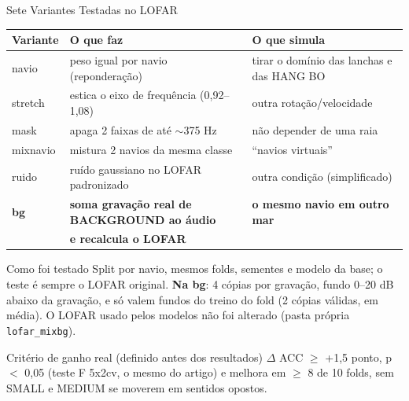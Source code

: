 \documentclass[aspectratio=169]{beamer}
\begin{document}
\begin{frame}{Sete Variantes Testadas no LOFAR}
    \footnotesize
    \begin{table}
    \centering
    \scriptsize
    \setlength{\tabcolsep}{4pt}
    \begin{tabular}{lll}
    \toprule
    Variante & O que faz & O que simula \\
    \midrule
    navio & peso igual por navio (reponderação) & tirar o domínio das lanchas e das HANG BO \\
    stretch & estica o eixo de frequência (0,92--1,08) & outra rotação/velocidade \\
    mask & apaga 2 faixas de até $\sim$375 Hz & não depender de uma raia \\
    mixnavio & mistura 2 navios da mesma classe & ``navios virtuais'' \\
    ruido & ruído gaussiano no LOFAR padronizado & outra condição (simplificado) \\
    \textbf{bg} & \textbf{soma gravação real de BACKGROUND ao áudio} & \textbf{o mesmo navio em outro mar} \\
    & \textbf{e recalcula o LOFAR} & \\
    \bottomrule
    \end{tabular}
    \end{table}
    \vspace{0.05cm}
    \begin{block}{\small Como foi testado}
        \scriptsize
        Split por navio, mesmos folds, sementes e modelo da base; o teste é sempre o LOFAR original. \textbf{Na bg}: 4 cópias por gravação, fundo 0--20 dB abaixo da gravação, e só valem fundos do treino do fold (2 cópias válidas, em média). O LOFAR usado pelos modelos não foi alterado (pasta própria \texttt{lofar\_mixbg}).
    \end{block}
    \begin{alertblock}{Critério de ganho real (definido antes dos resultados)}
        \scriptsize
        $\Delta$ ACC $\geq$ +1,5 ponto, p $<$ 0,05 (teste F 5x2cv, o mesmo do artigo) e melhora em $\geq$ 8 de 10 folds, sem SMALL e MEDIUM se moverem em sentidos opostos.
    \end{alertblock}
\end{frame}
\end{document}
